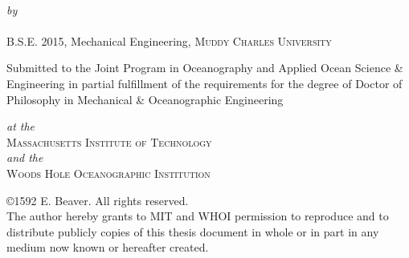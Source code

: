 \def\signature#1#2{\par\noindent#1\dotfill\null\\*
  {\raggedleft #2\par}}


\makeatletter

\begin{titlepage}
  \begin{center}
    \begin{Large}
      \@title
    \end{Large}\\[0.1em]
    \emph{\footnotesize by}\\
    {\large \@author} \\[-0.25em]
    B.S.E. 2015, Mechanical Engineering, \textsc{Muddy Charles University} \\ [2em]
    \begin{singlespace}
    {Submitted to the Joint Program in Oceanography and Applied Ocean Science \& Engineering in partial fulfillment of the requirements for the degree of Doctor of Philosophy in Mechanical \& Oceanographic Engineering} \\
    \end{singlespace}
    \emph{\footnotesize at the}\\
    {\large \textsc{Massachusetts Institute of Technology}} \\
    \emph{\footnotesize and the}\\
    {\large \textsc{Woods Hole Oceanographic Institution}} \\ [2em]
    \begin{singlespace}
    {\copyright1592 E. Beaver. All rights reserved. \\ The author hereby grants to MIT and WHOI permission to reproduce and to distribute publicly copies of this thesis document in whole or in part in any medium now known or hereafter created.} \\ [2em]


\end{singlespace}
\end{center}
\end{titlepage}
